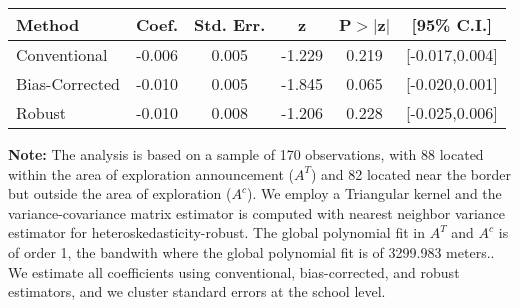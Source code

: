 \begin{table}[htbp]\centering
 \footnotesize 
\begin{tabular}{lccccc}
\hline\hline
Method & Coef. & Std. Err. & z & P$>|$z$|$ & [95\% C.I.] \\ 
\hline \hline  
Conventional & -0.006 & 0.005 & -1.229 & 0.219 & [-0.017,0.004] \\ 
 Bias-Corrected & -0.010 & 0.005 & -1.845 & 0.065 & [-0.020,0.001] \\ 
Robust & -0.010 & 0.008 & -1.206 & 0.228 & [-0.025,0.006] \\ 
  \hline\hline
\end{tabular}
\label{table:rd}
\begin{tablenotes} 
  \justifying \tiny \textbf{Note: }    
   The analysis is based on a sample of 170 observations, with 88 located within the area of exploration announcement ($A^{T}$) and 82 located near the border but outside the area of exploration  ($A^{c}$). 
           We employ a Triangular kernel and the variance-covariance matrix estimator is computed with nearest neighbor variance estimator for heteroskedasticity-robust. The global polynomial fit in  $A^{T}$ and $A^{c}$ is of order 1, the bandwith where the global polynomial fit is of 3299.983 meters.. We estimate all coefficients using conventional, bias-corrected, and robust estimators, and we cluster standard errors at the school level. \end{tablenotes} 
 \end{table} 

